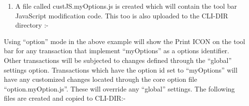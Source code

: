 \documentclass[letterpaper,10pt,english]{sphinxmanual}
\begin{document}
\begin{sphinxVerbatim}[commandchars=\\\{\}]
       
 
\end{sphinxVerbatim}
\begin{enumerate}
\def\theenumi{\arabic{enumi}}
\def\labelenumi{\theenumi .}
\makeatletter\def\p@enumii{\p@enumi \theenumi .}\makeatother
\setcounter{enumi}{1}
\item {} 
A file called custJS.myOptions.js is created which will contain the tool bar JavaScript modification code. This too is also uploaded to the CLI-DIR directory :-

\end{enumerate}

\begin{sphinxVerbatim}[commandchars=\\\{\}]
  
    
  
\end{sphinxVerbatim}

Using “option” mode in the above example will show the Print ICON on the tool bar for any transaction that implement “myOptions” as a options identifier. Other transactions will be subjected to changes defined through the “global” settings option. Transactions which have the option id set to “myOptions” will have any customized changes located through the core option file “option.myOption.js”. These will override any “global” settings. The following files are created and copied to CLI-DIR:-
\end{document}
